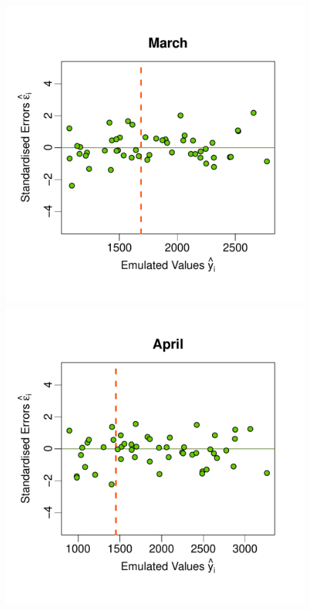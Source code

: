 \documentclass[a4paper, 12pt]{article}
\begin{document}
\begin{figure}
 \includegraphics[width=\scale]{Validation_Plots/Evaluation_Set/Evaluation_Scatter_03_Mar}\\[-3ex]
 \includegraphics[width=\scale]{Validation_Plots/Evaluation_Set/Evaluation_Scatter_04_Apr}\hspace{-1ex}

\end{figure}
\end{document}
